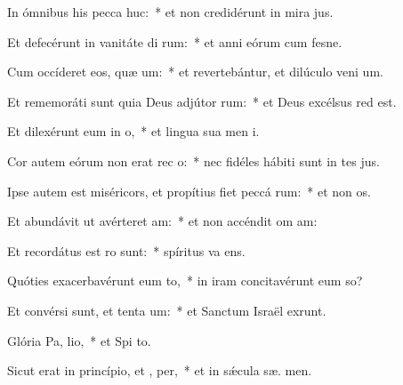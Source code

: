 \item In ómnibus his pecca huc:~* et non credidérunt in mira jus.
\item Et defecérunt in vanitáte di rum:~* et anni eórum cum fesne.
\item Cum occíderet eos, quæ um:~* et revertebántur, et dilúculo veni  um.
\item Et rememoráti sunt quia Deus adjútor  rum:~* et Deus excélsus red  est.
\item Et dilexérunt eum in  o,~* et lingua sua men  i.
\item Cor autem eórum non erat rec  o:~* nec fidéles hábiti sunt in tes jus.
\item Ipse autem est miséricors, et propítius fiet peccá rum:~* et non  os.
\item Et abundávit ut avérteret  am:~* et non accéndit om  am:
\item Et recordátus est  ro sunt:~* spíritus va   ens.
\item Quóties exacerbavérunt eum  to,~* in iram concitavérunt eum  so?
\item Et convérsi sunt, et tenta um:~* et Sanctum Israël exrunt.
\item Glória Pa,  lio,~* et Spi to.
\item Sicut erat in princípio, et ,  per,~* et in sǽcula sæ. men.
